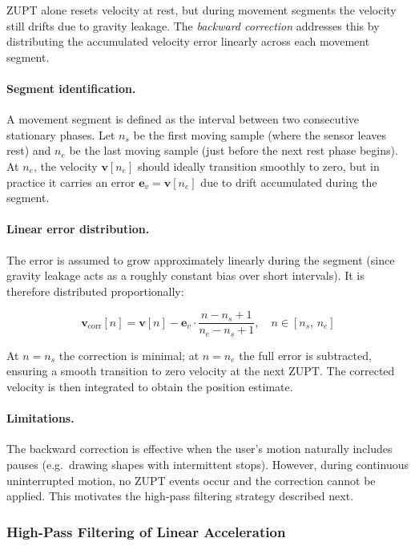ZUPT alone resets velocity at rest, but during movement segments the velocity
still drifts due to gravity leakage. The \emph{backward correction} addresses
this by distributing the accumulated velocity error linearly across each
movement segment.

\paragraph{Segment identification.}
A movement segment is defined as the interval between two consecutive
stationary phases. Let $n_s$ be the first moving sample (where the sensor
leaves rest) and $n_e$ be the last moving sample (just before the next rest
phase begins). At $n_e$, the velocity $\mathbf{v}[n_e]$ should ideally
transition smoothly to zero, but in practice it carries an error
$\mathbf{e}_v = \mathbf{v}[n_e]$ due to drift accumulated during the segment.

\paragraph{Linear error distribution.}
The error is assumed to grow approximately linearly during the segment (since
gravity leakage acts as a roughly constant bias over short intervals). It is
therefore distributed proportionally:

\begin{equation}
  \mathbf{v}_\text{corr}[n] = \mathbf{v}[n]
    - \mathbf{e}_v \cdot \frac{n - n_s + 1}{n_e - n_s + 1},
    \quad n \in [n_s,\, n_e]
  \label{eq:backward_correction}
\end{equation}

\noindent At $n = n_s$ the correction is minimal; at $n = n_e$ the full error
is subtracted, ensuring a smooth transition to zero velocity at the next ZUPT.
The corrected velocity is then integrated to obtain the position estimate.

\paragraph{Limitations.}
The backward correction is effective when the user's motion naturally includes
pauses (e.g.\ drawing shapes with intermittent stops). However, during
continuous uninterrupted motion, no ZUPT events occur and the correction
cannot be applied. This motivates the high-pass filtering strategy described
next.

\subsubsection{High-Pass Filtering of Linear Acceleration}
\label{sec:proj:highpass}

